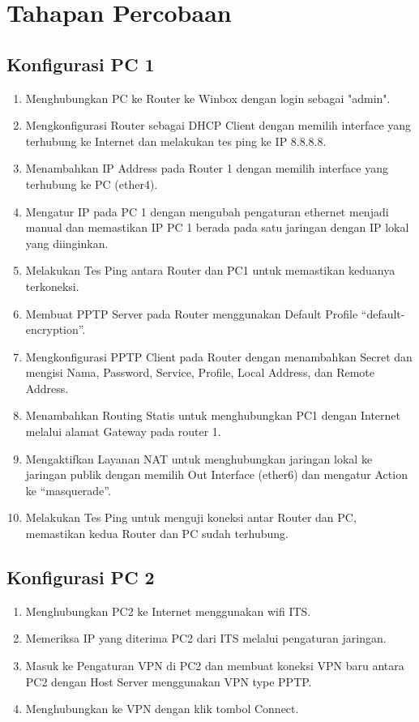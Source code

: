 \section*{Tahapan Percobaan} %

    \subsection*{Konfigurasi PC 1}

    \begin{enumerate}
        \item Menghubungkan PC ke Router ke Winbox dengan login sebagai "admin".
        \item Mengkonfigurasi Router sebagai DHCP Client dengan memilih interface yang terhubung ke Internet dan melakukan tes ping ke IP 8.8.8.8.
        \item Menambahkan IP Address pada Router 1 dengan memilih interface yang terhubung ke PC (ether4).
        \item Mengatur IP pada PC 1 dengan mengubah pengaturan ethernet menjadi manual dan memastikan IP PC 1 berada pada satu jaringan dengan IP lokal yang diinginkan.
        \item Melakukan Tes Ping antara Router dan PC1 untuk memastikan keduanya terkoneksi.
        \item Membuat PPTP Server pada Router menggunakan Default Profile “default-encryption”.
        \item Mengkonfigurasi PPTP Client pada Router dengan menambahkan Secret dan mengisi Nama, Password, Service, Profile, Local Address, dan Remote Address.
        \item Menambahkan Routing Statis untuk menghubungkan PC1 dengan Internet melalui alamat Gateway pada router 1.
        \item Mengaktifkan Layanan NAT untuk menghubungkan jaringan lokal ke jaringan publik dengan memilih Out Interface (ether6) dan mengatur Action ke “masquerade”.
        \item Melakukan Tes Ping untuk menguji koneksi antar Router dan PC, memastikan kedua Router dan PC sudah terhubung.
    \end{enumerate}

    \subsection*{Konfigurasi PC 2}

    \begin{enumerate}
        \item Menghubungkan PC2 ke Internet menggunakan wifi ITS.
        \item Memeriksa IP yang diterima PC2 dari ITS melalui pengaturan jaringan.
        \item Masuk ke Pengaturan VPN di PC2 dan membuat koneksi VPN baru antara PC2 dengan Host Server menggunakan VPN type PPTP.
        \item Menghubungkan ke VPN dengan klik tombol Connect.
    \end{enumerate}

